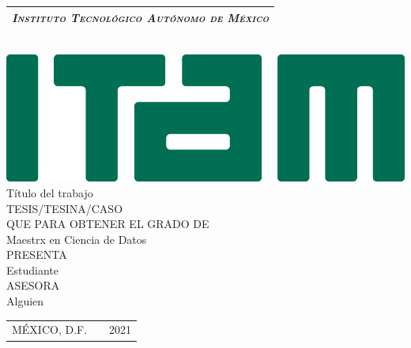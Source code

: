 
\thispagestyle{empty}
\setcounter{page}{1}
\begin{center}\vspace{70pt}
\begin{tabular}{c}
\hline
\Large \emph{\textsc{Instituto Tecnológico Autónomo de México}}\\
\hline
\end{tabular}\\
\vspace{20pt}
\includegraphics[width=.8\linewidth]{LOGO_ITAM.jpeg}\\
\vspace{20pt}
\huge Título del trabajo \\
\vspace{20pt}
\normalsize {\Large TESIS/TESINA/CASO}\\
\vspace{15pt}
QUE PARA OBTENER EL GRADO DE\\
\vspace{3pt}
{\Large Maestrx en Ciencia de Datos}\\
\vspace{27pt}
PRESENTA\\
\vspace{4pt}
{\Large Estudiante} \\
\vspace{23pt} %
ASESORA\\
{\Large Alguien} \\
\vspace{23pt}
\vspace{1em}
\begin{tabular}{lcr}
MÉXICO, D.F. & \hspace{60pt} & 2021
\end{tabular}
\end{center}
\mbox{ }
\vspace{70pt}
\mbox{ }
